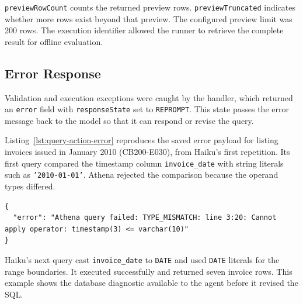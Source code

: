 \texttt{previewRowCount} counts the returned preview rows.
\texttt{previewTruncated} indicates whether more rows exist beyond that preview.
The configured preview limit was 200 rows.
The execution identifier allowed the runner to retrieve the complete result
for offline evaluation.

\subsection{Error Response}

Validation and execution exceptions were caught by the handler, which returned
an \texttt{error} field with \texttt{responseState} set to \texttt{REPROMPT}.
This state passes the error message back to the model so that it can respond
or revise the query.

Listing~\ref{lst:query-action-error} reproduces the saved error payload for
listing invoices issued in January 2010 (CB200-E030), from Haiku's first
repetition. Its first query compared the timestamp column
\texttt{invoice\_date} with string literals such as \texttt{'2010-01-01'}.
Athena rejected the comparison because the operand types differed.

\begin{minipage}{\textwidth}
\begin{lstlisting}[caption={Saved date-comparison error.},label={lst:query-action-error}]
{
  "error": "Athena query failed: TYPE_MISMATCH: line 3:20: Cannot apply operator: timestamp(3) <= varchar(10)"
}
\end{lstlisting}
\end{minipage}
\endgroup

Haiku's next query cast \texttt{invoice\_date} to \texttt{DATE} and used
\texttt{DATE} literals for the range boundaries. It executed successfully
and returned seven invoice rows. This example shows the database diagnostic
available to the agent before it revised the SQL.
